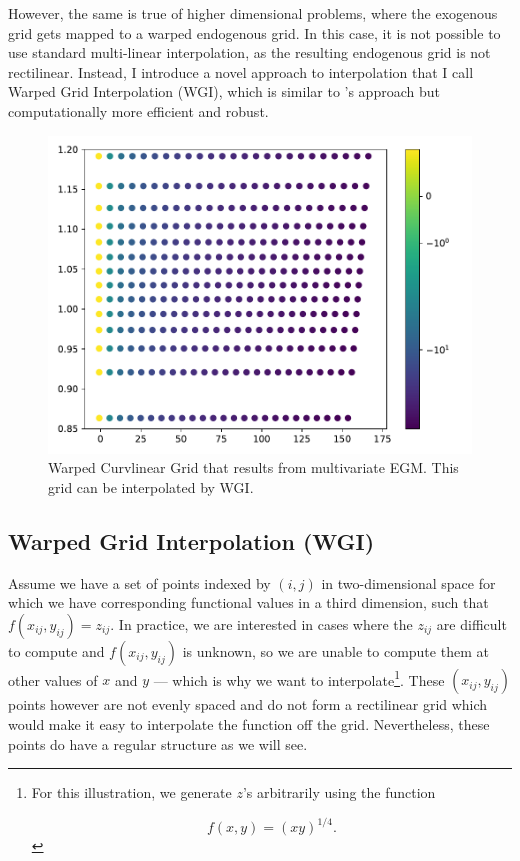 \documentclass{article}
\begin{document}
However, the same is true of higher dimensional problems, where the exogenous grid gets mapped to a warped endogenous grid. In this case, it is not possible to use standard multi-linear interpolation, as the resulting endogenous grid is not rectilinear. Instead, I introduce a novel approach to interpolation that I call Warped Grid Interpolation (WGI), which is similar to \citet{White2015}'s approach but computationally more efficient and robust.

\begin{figure}[!htbp]
\centering
\includegraphics[width=0.7\linewidth]{files/LaborSeparableWarped-ca8c28843633a390245c2c41c1c24cc0.pdf}
\caption{Warped Curvlinear Grid that results from multivariate EGM. This grid can be interpolated by WGI.}
\label{fig:LaborSeparableWarpedGrid}
\end{figure}

\subsection{Warped Grid Interpolation (WGI)}\label{Warped Grid Interpolation (WGI)}

Assume we have a set of points indexed by $(i,j)$ in two-dimensional space for which we have corresponding functional values in a third dimension, such that $f(x_{ij},y_{ij}) = z_{ij}$. In practice, we are interested in cases where the $z_{ij}$ are difficult to compute and $f(x_{ij},y_{ij})$ is unknown, so we are unable to compute them at other values of $x$ and $y$ --- which is why we want to interpolate\footnote{For this illustration, we generate $z$'s arbitrarily using the function

\begin{equation}
f(x,y) = (xy)^{1/4}.
\end{equation}}. These $(x_{ij},y_{ij})$ points however are not evenly spaced and do not form a rectilinear grid which would make it easy to interpolate the function off the grid. Nevertheless, these points do have a regular structure as we will see.
\end{document}
